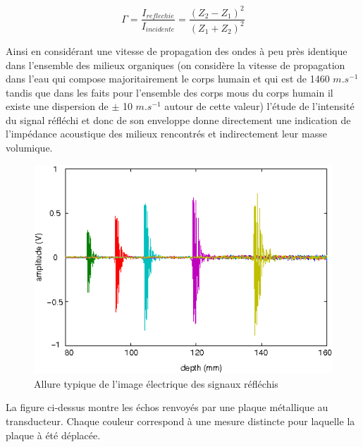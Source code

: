 \documentclass[12pt]{article}
\begin{document}
\[\Gamma = \dfrac{I_{reflechie}}{I_{incidente}} = \dfrac{(Z_2-Z_1)^2}{(Z_1+Z_2)^2}\]

\vspace{10pt}

Ainsi en considérant une vitesse de propagation des ondes à peu près identique dans l'ensemble des milieux organiques (on considère la vitesse de propagation dans l'eau qui compose majoritairement le corps humain et qui est de 1460 $m.s^{-1}$ tandis que dans les faits pour l'ensemble des corps mous du corps humain il existe une dispersion de $\pm$ 10 $m.s^{-1}$ autour de cette valeur) l'étude de l'intensité du signal réfléchi et donc de son enveloppe donne directement une indication de l'impédance acoustique des milieux rencontrés et indirectement leur masse volumique.   \par

\vspace{10pt}

\begin{figure}[!h]
  \vspace{-0pt}
  \begin{center}
    \includegraphics[width=14cm]{Images_Rapport/sig}
  \end{center}
  
  \caption{Allure typique de l'image électrique des signaux réfléchis}
  
\end{figure}

La figure ci-dessus montre les échos renvoyés par une plaque métallique au transducteur. Chaque couleur correspond à une mesure distincte pour laquelle la plaque à été déplacée. \par
\vspace{10pt}
\end{document}
